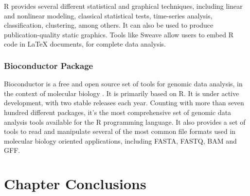 R provides several different statistical and graphical techniques, including
linear and nonlinear modeling, classical statistical tests, time-series
analysis, classification, clustering, among others. It can also be used to
produce publication-quality static graphics. Tools like Sweave
\cite{lmucs-papers:Leisch:2002} allow users to embed R code in \LaTeX{}
documents, for complete data analysis.

\subsubsection*{Bioconductor Package}

Bioconductor is a free and open source set of tools for genomic data analysis,
in the context of molecular biology \cite{lmucs-papers:Leisch:2002}. It is
primarily based on R. It is under active development, with two stable releases
each year. Counting with more than seven hundred different packages, it's the
most comprehensive set of genomic data analysis tools available for the R
programming language. It also provides a set of tools to read and manipulate
several of the most common file formats used in molecular biology oriented
applications, including FASTA, FASTQ, BAM and GFF.

\section{Chapter Conclusions}
